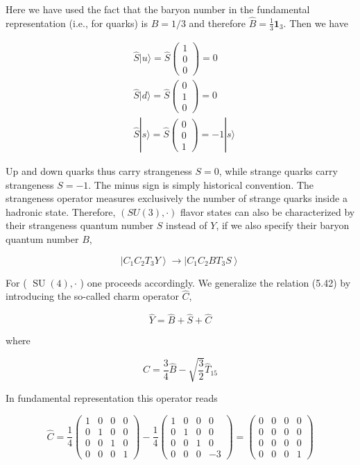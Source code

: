 \documentclass[10pt, letterpaper]{article}
\begin{document}
Here we have used the fact that the baryon number in the fundamental representation (i.e., for quarks) is $B=1 / 3$ and therefore $\hat{B}=\frac{1}{3} \mathbf{1}_{3}$. Then we have

$$
\begin{aligned}
& \hat{S}|u\rangle=\hat{S}\left(\begin{array}{l}
1 \\
0 \\
0
\end{array}\right)=0 \\
& \hat{S}|d\rangle=\hat{S}\left(\begin{array}{l}
0 \\
1 \\
0
\end{array}\right)=0 \\
& \hat{S}|s\rangle=\hat{S}\left(\begin{array}{l}
0 \\
0 \\
1
\end{array}\right)=-1|s\rangle
\end{aligned}
$$

Up and down quarks thus carry strangeness $S=0$, while strange quarks carry strangeness $S=-1$. The minus sign is simply historical convention. The strangeness operator measures exclusively the number of strange quarks inside a hadronic state. Therefore, $(S U(3), \cdot)$ flavor states can also be characterized by their strangeness quantum number $S$ instead of $Y$, if we also specify their baryon quantum number $B$,

$$
\left|C_{1} C_{2} T_{3} Y\right\rangle \longrightarrow\left|C_{1} C_{2} B T_{3} S\right\rangle
$$

For ( $\operatorname{SU}(4), \cdot$ ) one proceeds accordingly. We generalize the relation (5.42) by introducing the so-called charm operator $\hat{C}$,

$$
\hat{Y}=\hat{B}+\hat{S}+\hat{C}
$$

where

$$
\hat{C}=\frac{3}{4} \hat{B}-\sqrt{\frac{3}{2}} \hat{T}_{15}
$$

In fundamental representation this operator reads

$$
\hat{C}=\frac{1}{4}\left(\begin{array}{cccc}
1 & 0 & 0 & 0 \\
0 & 1 & 0 & 0 \\
0 & 0 & 1 & 0 \\
0 & 0 & 0 & 1
\end{array}\right)-\frac{1}{4}\left(\begin{array}{cccc}
1 & 0 & 0 & 0 \\
0 & 1 & 0 & 0 \\
0 & 0 & 1 & 0 \\
0 & 0 & 0 & -3
\end{array}\right)=\left(\begin{array}{cccc}
0 & 0 & 0 & 0 \\
0 & 0 & 0 & 0 \\
0 & 0 & 0 & 0 \\
0 & 0 & 0 & 1
\end{array}\right)
$$
\end{document}
